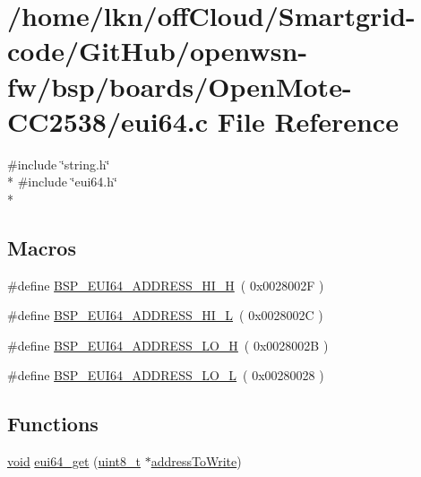 \hypertarget{_open_mote-_c_c2538_2eui64_8c}{}\section{/home/lkn/off\+Cloud/\+Smartgrid-\/code/\+Git\+Hub/openwsn-\/fw/bsp/boards/\+Open\+Mote-\/\+C\+C2538/eui64.c File Reference}
\label{_open_mote-_c_c2538_2eui64_8c}
{\ttfamily \#include \char`\"{}string.\+h\char`\"{}}\\*
{\ttfamily \#include \char`\"{}eui64.\+h\char`\"{}}\\*
\subsection*{Macros}
\begin{DoxyCompactItemize}
\item 
\#define \hyperlink{_open_mote-_c_c2538_2eui64_8c_a590ec65dacafcd54178dbe276712beb1}{B\+S\+P\+\_\+\+E\+U\+I64\+\_\+\+A\+D\+D\+R\+E\+S\+S\+\_\+\+H\+I\+\_\+H}~( 0x0028002\+F )
\item 
\#define \hyperlink{_open_mote-_c_c2538_2eui64_8c_ae63556adeaae1be11172597756fc2a1b}{B\+S\+P\+\_\+\+E\+U\+I64\+\_\+\+A\+D\+D\+R\+E\+S\+S\+\_\+\+H\+I\+\_\+L}~( 0x0028002\+C )
\item 
\#define \hyperlink{_open_mote-_c_c2538_2eui64_8c_a22d2d281dc8b08ff2948bac5bac213e9}{B\+S\+P\+\_\+\+E\+U\+I64\+\_\+\+A\+D\+D\+R\+E\+S\+S\+\_\+\+L\+O\+\_\+H}~( 0x0028002\+B )
\item 
\#define \hyperlink{_open_mote-_c_c2538_2eui64_8c_a7454b8be0e625d8f44f23043bf467f1a}{B\+S\+P\+\_\+\+E\+U\+I64\+\_\+\+A\+D\+D\+R\+E\+S\+S\+\_\+\+L\+O\+\_\+L}~( 0x00280028 )
\end{DoxyCompactItemize}
\subsection*{Functions}
\begin{DoxyCompactItemize}
\item 
\hyperlink{usb__devapi_8h_afabf60e7f57651d6d595a02c75f07cd0}{void} \hyperlink{group__eui64_gae49dc9068e3f46bfd188579192fc036b}{eui64\+\_\+get} (\hyperlink{_p_e___types_8h_aba7bc1797add20fe3efdf37ced1182c5}{uint8\+\_\+t} $\ast$\hyperlink{samr21__xpro_201bsp__flash_201bsp__flash_8c_a1f7d4f7dc49d64e8ffe1ff2e385657e5}{address\+To\+Write})
\end{DoxyCompactItemize}


